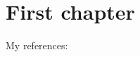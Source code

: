 \documentclass[../main]{subfiles}
\begin{document}
\newrefsection
\chapter{First chapter}

My references: \cite{A}

\printbibliography
\end{document}
